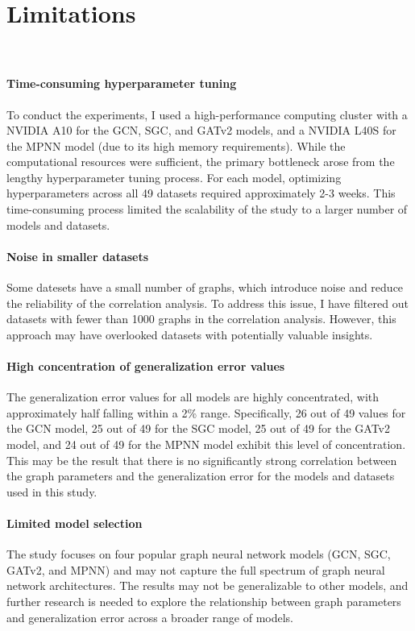 \newpage

\section{Limitations}~\label{sec:limitations}

\paragraph{Time-consuming hyperparameter tuning}
To conduct the experiments, I used a high-performance computing cluster with a NVIDIA A10 for the GCN, SGC, and GATv2 models, and a NVIDIA L40S for the MPNN model (due to its high memory requirements). While the computational resources were sufficient, the primary bottleneck arose from the lengthy hyperparameter tuning process. For each model, optimizing hyperparameters across all 49 datasets required approximately 2-3 weeks. This time-consuming process limited the scalability of the study to a larger number of models and datasets.

\paragraph{Noise in smaller datasets}
Some datesets have a small number of graphs, which introduce noise and reduce the reliability of the correlation analysis. To address this issue, I have filtered out datasets with fewer than 1000 graphs in the correlation analysis. However, this approach may have overlooked datasets with potentially valuable insights. 

\paragraph{High concentration of generalization error values}
The generalization error values for all models are highly concentrated, with approximately half falling within a 2\% range. Specifically, 26 out of 49 values for the GCN model, 25 out of 49 for the SGC model, 25 out of 49 for the GATv2 model, and 24 out of 49 for the MPNN model exhibit this level of concentration. This may be the result that there is no significantly strong correlation between the graph parameters and the generalization error for the models and datasets used in this study.

\paragraph{Limited model selection}
The study focuses on four popular graph neural network models (GCN, SGC, GATv2, and MPNN) and may not capture the full spectrum of graph neural network architectures. The results may not be generalizable to other models, and further research is needed to explore the relationship between graph parameters and generalization error across a broader range of models.

